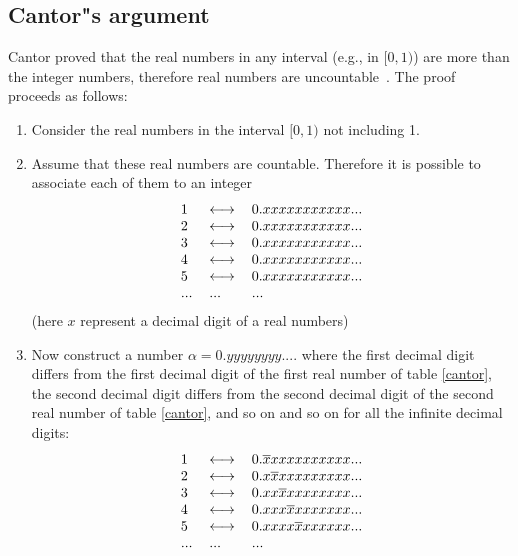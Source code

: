 \documentclass[justified, sixbynine]{tufte-book}
\theoremstyle{plain}%
\newtheorem * {corollary}{Corollary}
\theoremstyle{definition}
\theoremstyle{remark}
\newtheorem * {remark}{Remark}
\newtheorem * {note}{Note}
\begin{document}
\begin{fullwidth}
\subsection{Cantor"s argument}


Cantor proved that the real numbers in any interval (e.g., in $[0, 1)$)
are more than the integer numbers, therefore real numbers are uncountable~\cite{hofstadter}.
The proof proceeds as follows:

\begin{enumerate}
\item  Consider the real numbers in the interval $[0, 1)$ not including 1$.$

\item  Assume that these real numbers are countable. Therefore it is
possible to associate each of them to an integer
\begin{equation}
\begin{tabular}{lll}
1 & $\longleftrightarrow $ & $0.xxxxxxxxxxx...$ \\
2 & $\longleftrightarrow $ & $0.xxxxxxxxxxx...$ \\
3 & $\longleftrightarrow $ & $0.xxxxxxxxxxx...$ \\
4 & $\longleftrightarrow $ & $0.xxxxxxxxxxx...$ \\
5 & $\longleftrightarrow $ & $0.xxxxxxxxxxx...$ \\
... & ... & ...
\end{tabular}
\label{cantor}
\end{equation}
(here $x$ represent a decimal digit of a real numbers)

\item  Now construct a number $\alpha =0.yyyyyyyy....$ where the first
decimal digit differs from the first decimal digit of the first real number
of table \ref{cantor}, the second decimal digit differs from the second
decimal digit of the second real number of table \ref{cantor}, and so on and
so on for all the infinite decimal digits:
\begin{equation}
\begin{tabular}{lll}
1 & $\longleftrightarrow $ & $0.\overline{x}xxxxxxxxxx...$ \\
2 & $\longleftrightarrow $ & $0.x\overline{x}xxxxxxxxx...$ \\
3 & $\longleftrightarrow $ & $0.xx\overline{x}xxxxxxxx...$ \\
4 & $\longleftrightarrow $ & $0.xxx\overline{x}xxxxxxx...$ \\
5 & $\longleftrightarrow $ & $0.xxxx\overline{x}xxxxxx...$ \\
... & ... & ...
\end{tabular}
\label{cantor2}
\end{equation}


\end{enumerate}
\end{fullwidth}
\end{document}
